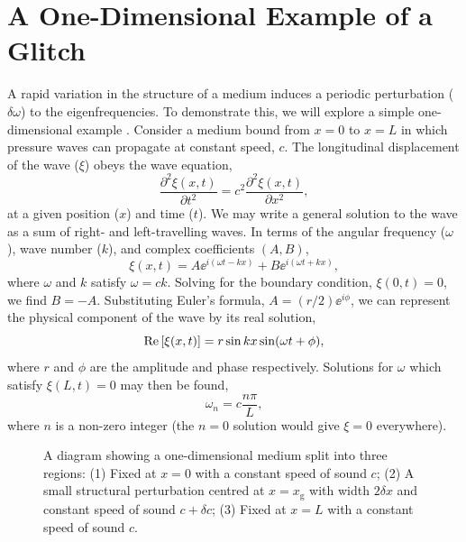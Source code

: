 \section[1D Glitch Example]{A One-Dimensional Example of a Glitch}\label{sec:1d-glitch}

\newcommand*{\glitch}{\ensuremath{{\mathrm{g}}}}

A rapid variation in the structure of a medium induces a periodic perturbation (\(\delta\omega\)) to the eigenfrequencies. To demonstrate this, we will explore a simple one-dimensional example \citep[similar to that of][]{Verner2005}. Consider a medium bound from \(x=0\) to \(x=L\) in which pressure waves can propagate at constant speed, \(c\). The longitudinal displacement of the wave (\(\xi\)) obeys the wave equation,
%
\begin{equation}
    \frac{\partial^2\xi(x, t)}{\partial t^2} = c^2 \frac{\partial^2\xi(x, t)}{\partial x^2},
\end{equation}
%
at a given position (\(x\)) and time (\(t\)). We may write a general solution to the wave as a sum of right- and left-travelling waves. In terms of the angular frequency (\(\omega\)), wave number (\(k\)), and complex coefficients \((A, B)\),
%
\begin{equation}
    \xi(x, t) = A \ee^{i (\omega t - k x)} + B \ee^{i (\omega t + k x)},
\end{equation}
%
where \(\omega\) and \(k\) satisfy \(\omega = c k\). Solving for the boundary condition, \(\xi(0, t) = 0\), we find \(B = - A\). Substituting Euler's formula, \(A = (r/2) \ee^{i\phi}\), we can represent the physical component of the wave by its real solution,
%
\begin{equation}
    {\mathrm{Re}}\left[\xi(x, t)\right] = r \sin k x \sin(\omega t + \phi),
\end{equation}
%
where \(r\) and \(\phi\) are the amplitude and phase respectively. Solutions for \(\omega\) which satisfy \(\xi(L, t)=0\) may then be found,
%
\begin{equation}
    \omega_n = c \frac{n \pi}{L}, \label{eq:omega-n}
\end{equation}
%
where \(n\) is a non-zero integer (the \(n=0\) solution would give \(\xi=0\) everywhere).

\begin{figure}[!tb]
    \centering
    
    \caption[A diagram showing a one-dimensional medium with a small structural perturbation.]{A diagram showing a one-dimensional medium split into three regions: (1) Fixed at \(x=0\) with a constant speed of sound \(c\); (2) A small structural perturbation centred at \(x=x_\glitch\) with width \(2\delta x\) and constant speed of sound \(c + \delta c\); (3) Fixed at \(x=L\) with a constant speed of sound \(c\).}
    \label{fig:1d-diagram}
\end{figure}

